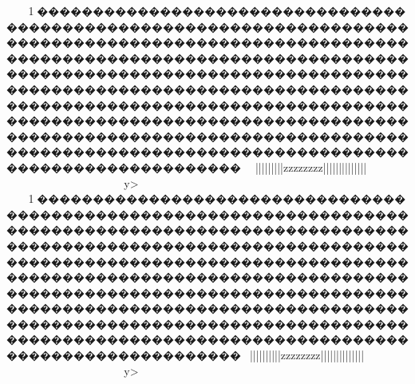 {{{{{{{{{{{{{{{{{{{{{{{{{{{{{{{{{{{{{{{{{{{{{{{{{{{{{{{{{{{{{{{{{{{{{{{{{{{{{{{{{{{{{{{{{{{{{{{{{{{{{{{{{{{{{{{{{{{{{{{{{{{{{{{{{{{{{{{{{{{{{{{{{{{{{{{{{{{{{{{{{{{{{{{{{{{{{{{{{{{{{{{{{{{{{{{{{{{{{{{{{{{{{{{{{{{{{{{{{{{{{{{{{{{{{{{{{{{{{{{{{{{{{{{{{{{{{{{{{{{{{{{{{{{{{{{{{{{{{{{{{{{{{{{{{{{{{{{{{{{{{{{{{{{{{{{{{{{{{{{{{{{{{{{{{{{{{{{{{{{{{{{{{{{{{{{{{{{{{{{{{{{{{{{{{{{{{{{{{{{{{{{{{{{{{{{{{{{{{{{{{{{{{{{{{{{{{{{{{{{{{{{{{{{{{{{{{{{{{{{{{{{{{{{{{{{{{{{{{{{{{{{{{{{{{{{{{{{{{{{{{{{{{{{{{{{{{{{{{{{{{{{{{{{{{{{{{{{{{{{{{{{{{{{{{{{{{{{{{{{{{{{{{{{{{{{{{{{{{{{{{{{{{{{{{{{{{{{{{{{{{{{{{{{{{{{{{{{{{{{{{{{{{{{{{{{{{{{{{{{{{{{{{{{{{{{{{{{{{{{{{{{{{{{{{{{{{{{{{{{{{{{{{{{{{{{{{{{{{{{{{{{{{{{{{{{{{{{{{{{{{{{{{{{{{{{{{{{{{{{{{{{{{{{{{{{{{{{{{{{{{{{{{{{{{{{{{{{{{{{{{{{{{{{{{{{{{{{{{{{{{{{{{{{{{{{{{{{{{{{{{{{{{{{{{{{{{{{{{{{{{{{{{{{{{{{{{{{{{{{{{{{{{{{{{{{{{{{{{{{{{{{{{{{{{{{{{{{{{{{{{{{{{{{{{{{{{{{{{{{{{{{{{{{{{{{{{{{{{{{{{{{{{{{{{{{{{{{{{{{{{{{{{{{{{{{{{{{{{{{{{{{{{{{{{{{{{{{{{{{{{{{{{{{{{{{{{{{{{{{{{{{{{{{{{{{{{{{{{{{{{1\ky������������������������������������������������������������������������������������������������������������������������������������������������������������������������������������������������������������������������������������������������������������������������������������������������������������������������������������������������������������������������������������������~~}}|}}}}}||||||||{{{{{{{{zzzzzzzz{{}}}|||{|||||||||||}}}}~~~~~~~~~~~~~~~~y>
1\ky������������������������������������������������������������������������������������������������������������������������������������������������������������������������������������������������������������������������������������������������������������������������������������������������������������������������������������������������������������������������������������������~}}||}}}}}||||||||{{{{{{{{zzzzzzzz{{}}}|||{|||||||||||}}}}~~~~~~~~~~~~~~~~y>
}}}}}}}}}}}}}}}}}}}}}}}}}}}}}}}}}}}}}}}}}}}}}}}}}}}}}}}}}}}}}}}}}}}}}}}}}}}}}}}}}}}}}}}}}}}}}}}}}}}}}}}}}}}}}}}}}}}}}}}}}}}}}}}}}}}}}}}}}}}}}}}}}}}}}}}}}}}}}}}}}}}}}}}}}}}}}}}}}}}}}}}}}}}}}}}}}}}}}}}}}}}}}}}}}}}}}}}}}}}}}}}}}}}}}}}}}}}}}}}}}}}}}}}}}}}}}}}}}}}}}}}}}}}}}}}}}}}}}}}}}}}}}}}}}}}}}}}}}}}}}}}}}}}}}}}}}}}}}}}}}}}}}}}}}}}}}}}}}}}}}}}}}}}}}}}}}}}}}}}}}}}}}}}}}}}}}}}}}}}}}}}}}}}}}}}}}}}}}}}}}}}}}}}}}}}}}}}}}}}}}}}}}}}}}}}}}}}}}}}}}}}}}}}}}}}}}}}}}}}}}}}}}}}}}}}}}}}}}}}}}}}}}}}}}}}}}}}}}}}}}}}}}}}}}}}}}}}}}}}}}}}}}}}}}}}}}}}}}}}}}}}}}}}}}}}}}}}}}}}}}}}}}}}}}}}}}}}}}}}}}}}}}}}}}}}}}}}}}}}}}}}}}}}}}}}}}}}}}}}}}}}}}}}}}}}}}}}}}}}}}}}}}}}}}}}}}}}}}}}}}}}}}}}}}}}}}}}}}}}}}}}}}}}}}}}}}}}}}}}}}}}}}}}}}}}}}}}}}}}}}}}}}}}}}}}}}}}}}}}}}}}}}}}}}}}}}}}}}}}}}}}}}}}}}}}}}}}}}}}}}}}}}}}}}}}}}}}}}}}}}}}}}}}}}}}}}}}}}}}}}}}}}}}}}}}}}}}}}}}}}}}}}}}}}}}}}}}}}}}}}}}}}}}}}}}}}}}}}}}}}}}}}}}}}}}}}}}}}}}}}}}}}}}}}}}}}}}}}}}}}}}}}}}}}}}}}}}}}}}}}}}}}}}}}}}}}}}}}}}}}}}}}}}}}}}}}}}}}}}}}}}}}}}}}}}}}}}}}}}}}}}}}}}}}}}}}}}
